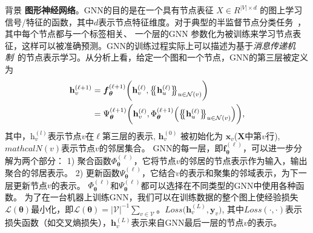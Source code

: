 \begin{section}{背景}
    \textbf{图形神经网络}。GNN的目的是在一个具有节点表征
    $\textit{X}\in\textit{R}^{\vert\textit{V}\vert\times d}$
    的图上学习信号/特征的函数，其中$d$表示节点特征维度。对于典型的半监督节点分类任务~\cite{kipf2016semi}，其中每个节点都与一个标签相关、 一个层的GNN 参数化为被训练来学习节点表征，这样可以被准确预测。GNN的训练过程实际上可以描述为基于\textit{消息传递机制}~\cite{gilmer2017neural}的节点表示学习。从分析上看，给定一个图和一个节点，GNN的第三层被定义为
    \begin{equation}
        \label{eq:gnn}
        \vspace{-1mm}
        \begin{split}
            \mathbf{h}_{v}^{(\ell+1)} &= \boldsymbol{f}_{\boldsymbol{\theta}}^{(\ell+1)} \bigg(\mathbf{h}_{v}^{(\ell)}, \big\{\!\!\big\{ \mathbf{h}^{(\ell)}_u  \big\}\!\!\big\}_{u \in \mathcal{N}(v)} \bigg) \\
            &= \Psi^{(\ell+1)}_{\boldsymbol{\theta}}\bigg( \mathbf{h}_{v}^{(\ell)},  \Phi^{(\ell+1)}_{\boldsymbol{\theta}}\Big(\big\{\!\!\big\{\mathbf{h}^{(\ell)}_u  \big\}\!\!\big\}_{u \in \mathcal{N}(v)}\Big) \bigg),
        \end{split}
        \vspace{-2mm}
        \end{equation}
    其中，$\textit{h}_{v}^{(\textit{l})}$表示节点$v$在$\ell$第三层的表示, $\textbf{h}^{(0)}_{v}$ 被初始化为 $\textbf{x}_{v}$($\textbf{X}$中第$v$行), $mathcal{N}(v)$表示节点$v$的邻居集合。
    GNN的每一层，即$\boldsymbol{f}_{\boldsymbol{\theta}}^{(\ell)}$，可以进一步分解为两个部分：
    1) 聚合函数$\Phi^{(\ell)}_{\boldsymbol{\theta}}$，它将节点$v$的邻居的节点表示作为输入，输出聚合的邻居表示。
    2) 更新函数$\Psi^{(\ell)}_{\boldsymbol{\theta}}$，它结合$v$的表示和聚集的邻域表示，为下一层更新节点$v$的表示。
    $\Phi^{(\ell)}_{\boldsymbol{\theta}}$和$\Psi^{(\ell)}_{\boldsymbol{\theta}}$都可以选择在不同类型的GNN中使用各种函数。
    为了在一台机器上训练GNN，我们可以在训练数据的整个图上使经验损失$\mathcal{L}(\boldsymbol{\theta})$最小化，即$\mathcal{L}(\boldsymbol{\theta}) = \vert\mathcal{V}\vert^{-1}\sum\nolimits_{v\in\mathcal{V}}。Loss\big(\mathbf{h}_{v}^{(L)},\mathbf{y}_{v}\big)$,
    其中$Loss(\cdot,\cdot)$表示损失函数（如交叉熵损失），$\mathbf{h}_{v}^{(L)}$表示来自GNN最后一层的节点$v$的表示。
\end{section}

